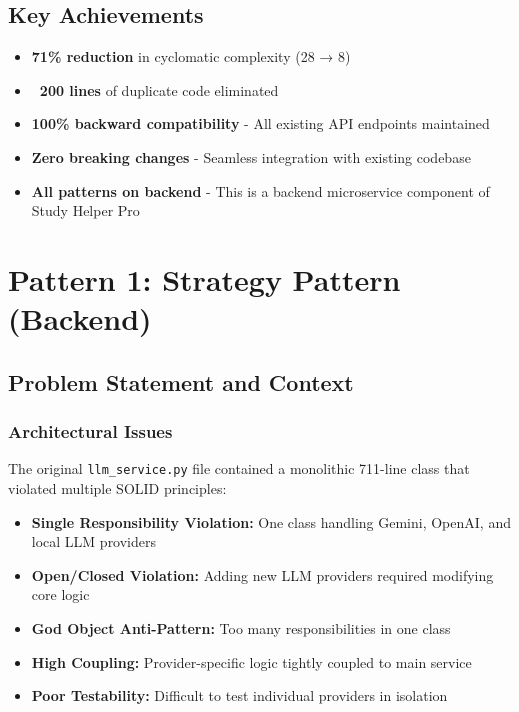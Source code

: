 \documentclass[11pt,a4paper]{article}
\begin{document}
\subsection{Key Achievements}

\begin{itemize}
    \item \textbf{71\% reduction} in cyclomatic complexity (28 → 8)
    \item \textbf{~200 lines} of duplicate code eliminated
    \item \textbf{100\% backward compatibility} - All existing API endpoints maintained
    \item \textbf{Zero breaking changes} - Seamless integration with existing codebase
    \item \textbf{All patterns on backend} - This is a backend microservice component of Study Helper Pro
\end{itemize}

\newpage

\section{Pattern 1: Strategy Pattern (Backend)}

\subsection{Problem Statement and Context}

\subsubsection{Architectural Issues}

The original \texttt{llm\_service.py} file contained a monolithic 711-line class that violated multiple SOLID principles:

\begin{itemize}
    \item \textbf{Single Responsibility Violation:} One class handling Gemini, OpenAI, and local LLM providers
    \item \textbf{Open/Closed Violation:} Adding new LLM providers required modifying core logic
    \item \textbf{God Object Anti-Pattern:} Too many responsibilities in one class
    \item \textbf{High Coupling:} Provider-specific logic tightly coupled to main service
    \item \textbf{Poor Testability:} Difficult to test individual providers in isolation
\end{itemize}
\end{document}

